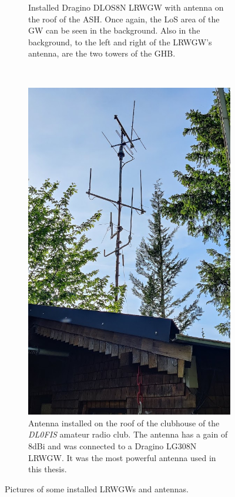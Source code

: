 \begin{figure}
\begin{subfigure}[t]{0.5\textwidth}
        \caption{
            Installed Dragino DLOS8N \acl{LRWGW} with antenna on the roof of the \ac{ASH}.
            Once again, the \ac{LoS} area of the \acl{GW} can be seen in the background.
            Also in the background, to the left and right of the \acl{LRWGW}'s antenna, are the two towers of the \ac{GHB}.
        }\label{pic:dragino-gateway-ash}
    \end{subfigure}%
    ~
    \begin{subfigure}[t]{0.5\textwidth}
        \centering
        \includegraphics[width=1\textwidth]{pictures/hardware/gateway-deployment/gateway_dl0fis_clubhouse.jpg}
        \caption{
            Antenna installed on the roof of the clubhouse of the \emph{DL0FIS} amateur radio club.
            The antenna has a gain of 8dBi and was connected to a Dragino LG308N \acl{LRWGW}.
            It was the most powerful antenna used in this thesis.
        }\label{pic:antenna-dl0fis-clubhouse}
    \end{subfigure}

    \caption{Pictures of some installed \aclp{LRWGW} and antennas.}
\end{figure}

